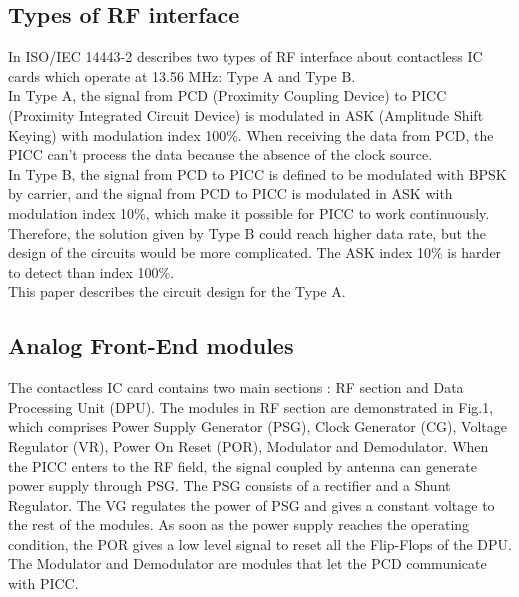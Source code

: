 \documentclass[a4paper, 10pt, conference]{ieeeconf}      %
\begin{document}
\subsection{Types of RF interface}

In ISO/IEC 14443-2 describes two types of RF interface about contactless IC cards which operate at 13.56 MHz: Type A and Type B. \\
In Type A, the signal from PCD (Proximity Coupling Device) to PICC (Proximity Integrated Circuit Device) is modulated in ASK (Amplitude Shift Keying) with modulation index 100\%. When receiving the data from PCD, the PICC can’t process the data because the absence of the clock source. \\
In Type B, the signal from PCD to PICC is defined to be modulated with BPSK by carrier, and the signal from PCD to PICC is modulated in ASK with modulation index 10\%, which make it possible for PICC to work continuously. Therefore, the solution given by Type B could reach higher data rate, but the design of the circuits would be more complicated. The ASK index 10\% is harder to detect than index 100\%. \\
This paper describes the circuit design for the Type A.

\subsection{Analog Front-End modules}

The contactless IC card contains two main sections \cite{c10}: RF section and Data Processing Unit (DPU). The modules in RF section are demonstrated in Fig.1, which comprises Power Supply Generator (PSG), Clock Generator (CG), Voltage Regulator (VR), Power On Reset (POR), Modulator and Demodulator.
When the PICC enters to the RF field, the signal coupled by antenna can generate power supply through PSG. The PSG consists of a rectifier and a Shunt Regulator. The VG regulates the power of PSG and gives a constant voltage to the rest of the modules. As soon as the power supply reaches the operating condition, the POR gives a low level signal to reset all the Flip-Flops of the DPU. The Modulator and Demodulator are modules that let the PCD communicate with PICC.
\end{document}
